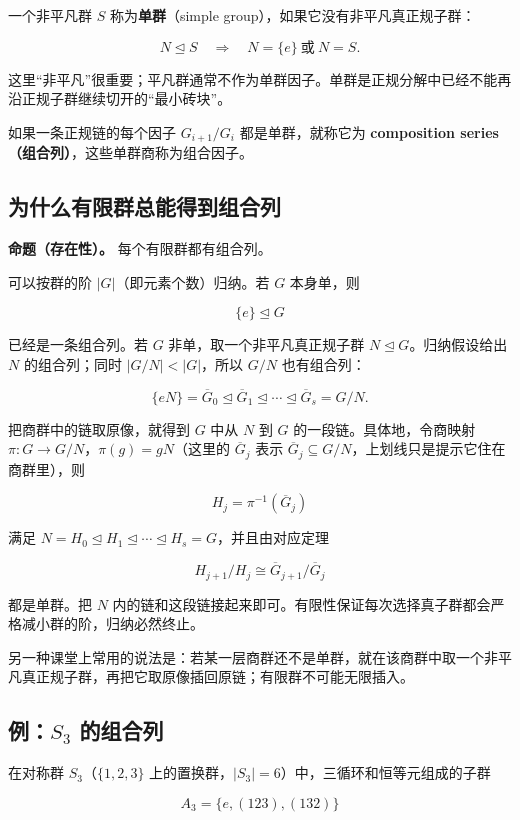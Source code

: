 一个非平凡群 $S$ 称为\textbf{单群}（simple group），如果它没有非平凡真正规子群：

\[
N\trianglelefteq S\quad\Longrightarrow\quad N=\{e\}\ \text{或}\ N=S.
\]

这里“非平凡”很重要；平凡群通常不作为单群因子。单群是正规分解中已经不能再沿正规子群继续切开的“最小砖块”。

如果一条正规链的每个因子 $G_{i+1}/G_i$ 都是单群，就称它为 \textbf{composition series（组合列）}，这些单群商称为组合因子。

\subsection{为什么有限群总能得到组合列}


\textbf{命题（存在性）。} 每个有限群都有组合列。

可以按群的阶 $|G|$（即元素个数）归纳。若 $G$ 本身单，则

\[
\{e\}\trianglelefteq G
\]

已经是一条组合列。若 $G$ 非单，取一个非平凡真正规子群 $N\trianglelefteq G$。归纳假设给出 $N$ 的组合列；同时 $|G/N|<|G|$，所以 $G/N$ 也有组合列：

\[
\{eN\}=\overline G_0\trianglelefteq\overline G_1\trianglelefteq\cdots\trianglelefteq\overline G_s=G/N.
\]

把商群中的链取原像，就得到 $G$ 中从 $N$ 到 $G$ 的一段链。具体地，令商映射 $\pi:G\to G/N$，$\pi(g)=gN$（这里的 $\overline G_j$ 表示 $\overline G_j\subseteq G/N$，上划线只是提示它住在商群里），则

\[
H_j=\pi^{-1}(\overline G_j)
\]

满足 $N=H_0\trianglelefteq H_1\trianglelefteq\cdots\trianglelefteq H_s=G$，并且由对应定理

\[
H_{j+1}/H_j\cong \overline G_{j+1}/\overline G_j
\]

都是单群。把 $N$ 内的链和这段链接起来即可。有限性保证每次选择真子群都会严格减小群的阶，归纳必然终止。

另一种课堂上常用的说法是：若某一层商群还不是单群，就在该商群中取一个非平凡真正规子群，再把它取原像插回原链；有限群不可能无限插入。

\subsection{例：$S_3$ 的组合列}


在对称群 $S_3$（$\{1,2,3\}$ 上的置换群，$|S_3|=6$）中，三循环和恒等元组成的子群

\[
A_3=\{e,(123),(132)\}
\]

